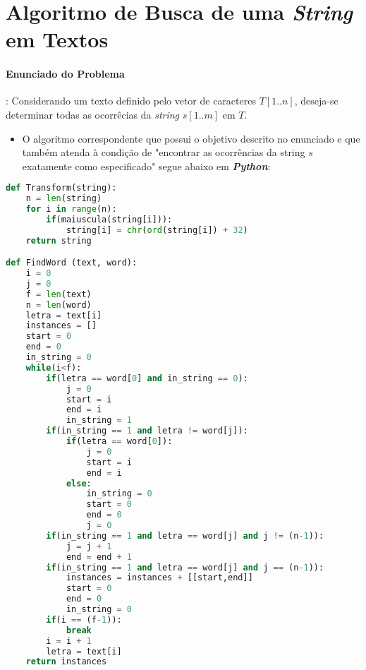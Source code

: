 \documentclass[paper=a4, fontsize=11pt]{scrartcl} %
\numberwithin{equation}{section} %
\numberwithin{figure}{section} %
\numberwithin{table}{section} %
\begin{document}

\section{Algoritmo de Busca de uma \emph{String} em Textos}

\paragraph{Enunciado do Problema}: Considerando um texto definido pelo vetor de caracteres $T[1..n]$, deseja-se determinar todas as ocorrêcias da \emph{string} $s[1..m]$ em $T$. 

\begin{itemize}
   \item O algoritmo correspondente que possui o objetivo descrito no enunciado e que também atenda à condição de "encontrar as ocorrências da string $s$ exatamente como especificado" segue abaixo em \emph{\textbf{Python}}:
\end{itemize}

\pagebreak

\begin{lstlisting}[language=Python, caption=String Python Algorithm]
def Transform(string):
    n = len(string)
    for i in range(n):
        if(maiuscula(string[i])):
            string[i] = chr(ord(string[i]) + 32)
    return string

def FindWord (text, word):
    i = 0
    j = 0
    f = len(text)
    n = len(word)
    letra = text[i]
    instances = []
    start = 0
    end = 0
    in_string = 0
    while(i<f):
        if(letra == word[0] and in_string == 0):
            j = 0
            start = i
            end = i
            in_string = 1
        if(in_string == 1 and letra != word[j]):
            if(letra == word[0]):
                j = 0
                start = i
                end = i
            else:
                in_string = 0
                start = 0
                end = 0
                j = 0  
        if(in_string == 1 and letra == word[j] and j != (n-1)):
            j = j + 1
            end = end + 1   
        if(in_string == 1 and letra == word[j] and j == (n-1)):
            instances = instances + [[start,end]]
            start = 0
            end = 0
            in_string = 0
        if(i == (f-1)):
            break
        i = i + 1
        letra = text[i]
    return instances
\end{lstlisting}
\end{document}

